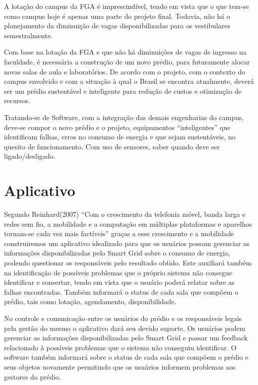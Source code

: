 A lotação do campus da FGA é imprescindível, tendo em vista que o que tem-se como campus hoje é apenas uma parte do projeto final. Todavia, não há o planejamento da diminuição de vagas disponibilizadas para os vestibulares semestralmente.

Com base na lotação da FGA e que não há diminuições de vagas de ingresso na faculdade, é necessária a construção de um novo prédio, para futuramente alocar novas salas de aula e laboratórios. De acordo com o projeto, com o contexto do campus envolvido e com a situação à qual o Brasil se encontra atualmente, deverá ser um prédio sustentável e inteligente para redução de custos e otimização de recursos.

Tratando-se de Software, com a integração das demais engenharias do campus, deve-se compor o novo prédio e o projeto, equipamentos “inteligentes” que identificam falhas, erros no consumo de energia e que sejam sustentáveis, no quesito de funcionamento. Com uso de sensores, saber quando deve ser ligado/desligado.


\section{Aplicativo}

Segundo Reinhard(2007) “Com o crescimento da telefonia móvel, banda larga e redes sem fio, a mobilidade e a computação em múltiplas plataformas e aparelhos tornam-se cada vez mais factíveis” graças a esse crescimento e a mobilidade construiremos um aplicativo idealizado para que os usuários possam gerenciar as informações disponibilizadas pelo Smart Grid sobre o consumo de energia, podendo questionar os responsáveis pelo resultado obtido. Este auxiliará também na identificação de possíveis problemas que o próprio sistema não consegue identificar e consertar, tendo em vista que o usuário poderá relatar sobre as falhas encontradas. Também informará o status de cada sala que compõem o prédio, tais como lotação, agendamento, disponibilidade.

No controle e comunicação entre os usuários do prédio e os responsáveis legais pela gestão do mesmo o aplicativo dará seu devido suporte. Os usuários podem gerenciar as informações disponibilizadas pelo Smart Grid e passar um feedback relacionado à possíveis problemas que o sistema não conseguiu identificar. O software também informará sobre o status de cada sala que compõem o prédio e seus objetos novamente permitindo que os usuários informem problemas aos gestores do prédio.

